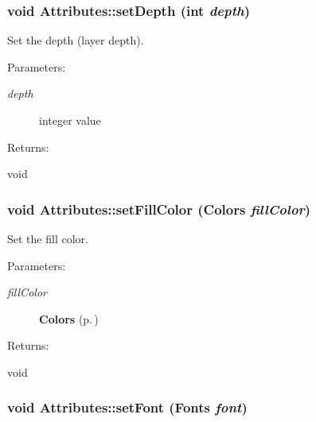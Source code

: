 \subsubsection{\setlength{\rightskip}{0pt plus 5cm}void Attributes::set\-Depth (int {\em depth})\hspace{0.3cm}{\tt  [inline]}}\label{classAttributes_a6}


Set the depth (layer depth). \begin{Desc}
\item[Parameters: ]\par
\begin{description}
\item[{\em 
depth}]integer value \end{description}
\end{Desc}
\begin{Desc}
\item[Returns: ]\par
void \end{Desc}
\subsubsection{\setlength{\rightskip}{0pt plus 5cm}void Attributes::set\-Fill\-Color ({\bf Colors} {\em fill\-Color})\hspace{0.3cm}{\tt  [inline]}}\label{classAttributes_a5}


Set the fill color. \begin{Desc}
\item[Parameters: ]\par
\begin{description}
\item[{\em 
fill\-Color}]{\bf Colors} {\rm (p.\,\pageref{classAttributes_s75})} \end{description}
\end{Desc}
\begin{Desc}
\item[Returns: ]\par
void \end{Desc}
\subsubsection{\setlength{\rightskip}{0pt plus 5cm}void Attributes::set\-Font ({\bf Fonts} {\em font})\hspace{0.3cm}{\tt  [inline]}}\label{classAttributes_a18}


